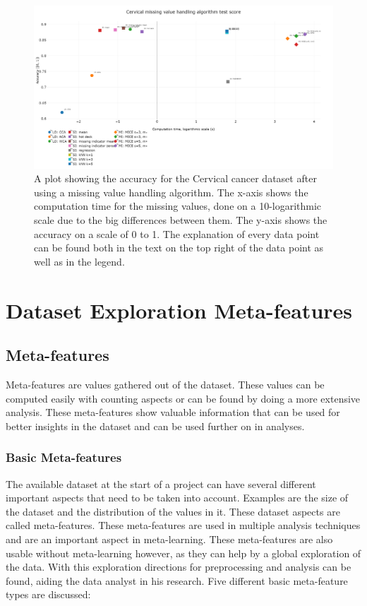 \documentclass[10pt,a4paper]{report}
\begin{document}
	\begin{figure}[H]
		\centering
		\includegraphics[angle=90,height=0.9\textheight]{cerv_acc.PNG}
		\caption{A plot showing the accuracy for the Cervical cancer dataset after using a missing value handling algorithm. The x-axis shows the computation time for the missing values, done on a 10-logarithmic scale due to the big differences between them. The y-axis shows the accuracy on a scale of 0 to 1. The explanation of every data point can be found both in the text on the top right of the data point as well as in the legend.}
		\label{fig:EvalCervhAcc}
	\end{figure}
	
	\chapter{Dataset Exploration Meta-features}
		
	
	\section{Meta-features}
	\label{app:MetaFeatures}
	
	Meta-features are values gathered out of the dataset. These values can be computed easily with counting aspects or can be found by doing a more extensive analysis. These meta-features show valuable information that can be used for better insights in the dataset and can be used further on in analyses.
	
	\subsection{Basic Meta-features}
	\label{subsec:BasicMF}
	
	The available dataset at the start of a project can have several different important aspects that need to be taken into account. Examples are the size of the dataset and the distribution of the values in it. These dataset aspects are called meta-features\cite{kluegl2009meta}. These meta-features are used in multiple analysis techniques and are an important aspect in meta-learning\cite{kluegl2009meta, castiello2005meta, vilalta2002perspective, bourbakis2011extracting}. These meta-features are also usable without meta-learning however, as they can help by a global exploration of the data. With this exploration directions for preprocessing and analysis can be found, aiding the data analyst in his research. Five different basic meta-feature types are discussed:
	
\end{document}
